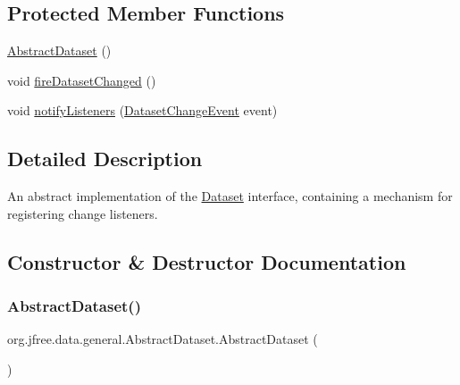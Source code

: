 \subsection*{Protected Member Functions}
\begin{DoxyCompactItemize}
\item 
\mbox{\hyperlink{classorg_1_1jfree_1_1data_1_1general_1_1_abstract_dataset_a86a99c6256714f7c9a409d16c8842796}{Abstract\+Dataset}} ()
\item 
void \mbox{\hyperlink{classorg_1_1jfree_1_1data_1_1general_1_1_abstract_dataset_a95eadb1f154c4b4310bd04792617e633}{fire\+Dataset\+Changed}} ()
\item 
void \mbox{\hyperlink{classorg_1_1jfree_1_1data_1_1general_1_1_abstract_dataset_a96514c405bb2dd442ae9e363af6e8876}{notify\+Listeners}} (\mbox{\hyperlink{classorg_1_1jfree_1_1data_1_1general_1_1_dataset_change_event}{Dataset\+Change\+Event}} event)
\end{DoxyCompactItemize}


\subsection{Detailed Description}
An abstract implementation of the \mbox{\hyperlink{interfaceorg_1_1jfree_1_1data_1_1general_1_1_dataset}{Dataset}} interface, containing a mechanism for registering change listeners. 

\subsection{Constructor \& Destructor Documentation}
\mbox{\label{classorg_1_1jfree_1_1data_1_1general_1_1_abstract_dataset_a86a99c6256714f7c9a409d16c8842796}} 
\subsubsection{\texorpdfstring{Abstract\+Dataset()}{AbstractDataset()}}
{\footnotesize\ttfamily org.\+jfree.\+data.\+general.\+Abstract\+Dataset.\+Abstract\+Dataset (\begin{DoxyParamCaption}{ }\end{DoxyParamCaption})\hspace{0.3cm}{\ttfamily [protected]}}

